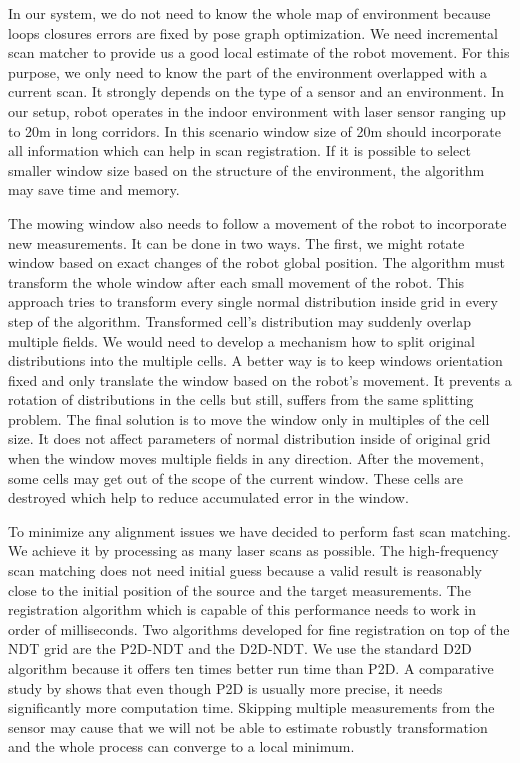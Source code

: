 In our system, we do not need to know the whole map of environment because loops closures errors are fixed by pose graph optimization. We need incremental scan matcher to provide us a good local estimate of the robot movement. For this purpose, we only need to know the part of the environment overlapped with a current scan. It strongly depends on the type of a sensor and an environment. In our setup, robot operates in the indoor environment with laser sensor ranging up to 20m in long corridors. In this scenario window size of 20m should incorporate all information which can help in scan registration. If it is possible to select smaller window size based on the structure of the environment, the algorithm may save time and memory. 

The mowing window also needs to follow a movement of the robot to incorporate new measurements. It can be done in two ways. The first, we might rotate window based on exact changes of the robot global position. The algorithm must transform the whole window after each small movement of the robot. This approach tries to transform every single normal distribution inside grid in every step of the algorithm. Transformed cell's distribution may suddenly overlap multiple fields. We would need to develop a mechanism how to split original distributions into the multiple cells. A better way is to keep windows orientation fixed and only translate the window based on the robot's movement. It prevents a rotation of distributions in the cells but still, suffers from the same splitting problem. The final solution is to move the window only in multiples of the cell size. It does not affect parameters of normal distribution inside of original grid when the window moves multiple fields in any direction. After the movement, some cells may get out of the scope of the current window. These cells are destroyed which help to reduce accumulated error in the window.

To minimize any alignment issues we have decided to perform fast scan matching. We achieve it by processing as many laser scans as possible. The high-frequency scan matching does not need initial guess because a valid result is reasonably close to the initial position of the source and the target measurements. The registration algorithm which is capable of this performance needs to work in order of milliseconds. Two algorithms developed for fine registration on top of the \gls{NDT} grid are the \gls{P2D}-\gls{NDT} and the \gls{D2D}-\gls{NDT}. We use the standard \gls{D2D} algorithm because it offers ten times better run time than \gls{P2D}. A comparative study by \cite{NDTcomparative} shows that even though \gls{P2D} is usually more precise, it needs significantly more computation time. Skipping multiple measurements from the sensor may cause that we will not be able to estimate robustly transformation and the whole process can converge to a local minimum. 

